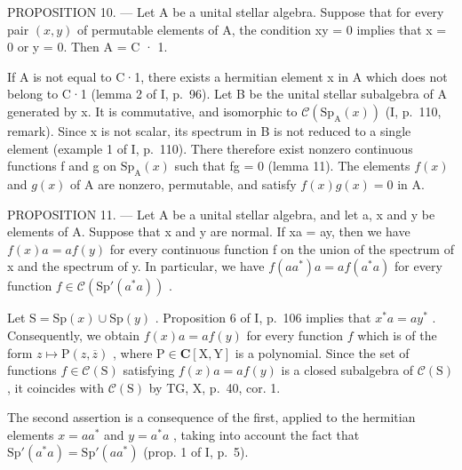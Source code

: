 PROPOSITION 10. --- Let A be a unital stellar algebra. Suppose that for every pair \((x,y)\) of permutable elements of A, the condition xy = 0 implies that x = 0 or y = 0. Then A = C · 1.

If A is not equal to C·1, there exists a hermitian element x in A which does not belong to C·1 (lemma 2 of I, p.~96). Let B be the unital stellar subalgebra of A generated by x. It is commutative, and isomorphic to \(\mathcal{C}(\mathrm{Sp}_{\mathrm{A}}(x))\) (I, p.~110, remark). Since x is not scalar, its spectrum in B is not reduced to a single element (example 1 of I, p.~110). There therefore exist nonzero continuous functions f and g on \(\mathrm{Sp}_{\mathrm{A}}(x)\) such that fg = 0 (lemma 11). The elements \(f(x)\) and \(g(x)\) of A are nonzero, permutable, and satisfy \(f(x)g(x) = 0\) in A.

PROPOSITION 11. --- Let A be a unital stellar algebra, and let a, x and y be elements of A. Suppose that x and y are normal. If xa = ay, then we have \(f(x)a = af(y)\) for every continuous function f on the union of the spectrum of x and the spectrum of y. In particular, we have \(f(aa^{*})a = af(a^{*}a)\) for every function \(f \in \mathcal{C}(\mathrm{Sp}'(a^{*}a))\) .

Let \(\mathrm{S} = \mathrm{Sp}(x) \cup \mathrm{Sp}(y)\) . Proposition 6 of I, p.~106 implies that \(x^{*}a = ay^{*}\) . Consequently, we obtain \(f(x)a = af(y)\) for every function \(f\) which is of the form \(z \mapsto \mathrm{P}(z,\overline{z})\) , where \(\mathrm{P} \in \mathbf{C}[\mathrm{X},\mathrm{Y}]\) is a polynomial. Since the set of functions \(f \in \mathcal{C}(\mathrm{S})\) satisfying \(f(x)a = af(y)\) is a closed subalgebra of \(\mathcal{C}(\mathrm{S})\) , it coincides with \(\mathcal{C}(\mathrm{S})\) by TG, X, p.~40, cor. 1.

The second assertion is a consequence of the first, applied to the hermitian elements \(x = aa^{*}\) and \(y = a^{*}a\) , taking into account the fact that \(\mathrm{Sp}'(a^{*}a) = \mathrm{Sp}'(aa^{*})\) (prop. 1 of I, p.~5).

